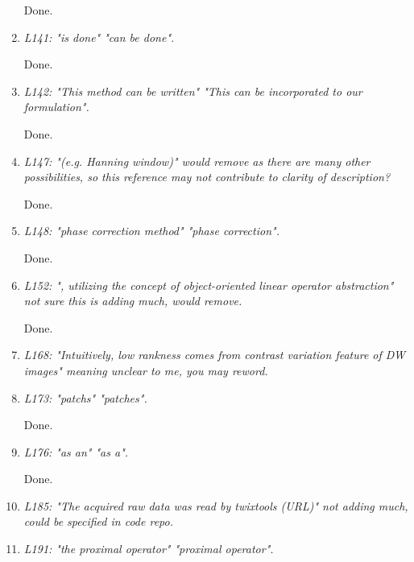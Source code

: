 \documentclass[a4paper,11pt,twoside]{report}
\begin{document}
\begin{enumerate}[resume]
    \hspace{1em} Done.

    \item \textit{L141: "is done" \textrightarrow "can be done".}

    \hspace{1em} Done.

    \item \textit{L142: "This method can be written" \textrightarrow "This can be incorporated to our formulation".}

    \hspace{1em} Done.

    \item \textit{L147: "(e.g. Hanning window)" \textrightarrow would remove as there are many other possibilities, so this reference may not contribute to clarity of description?}

    \hspace{1em} Done.

    \item \textit{L148: "phase correction method" \textrightarrow "phase correction".}

    \hspace{1em} Done.

    \item \textit{L152: ", utilizing the concept of object-oriented linear operator abstraction" \textrightarrow not sure this is adding much, would remove.}

    \hspace{1em} Done.

    \item \textit{L168: "Intuitively, low rankness comes from contrast variation feature of DW images" \textrightarrow meaning unclear to me, you may reword.}

    \item \textit{L173: "patchs" \textrightarrow "patches".}

    \hspace{1em} Done.

    \item \textit{L176: "as an" \textrightarrow "as a".}

    \hspace{1em} Done.

    \item \textit{L185: "The acquired raw data was read by twixtools (URL)" \textrightarrow not adding much, could be specified in code repo.}

    \item \textit{L191: "the proximal operator" \textrightarrow "proximal operator".}


\end{enumerate}
\end{document}
